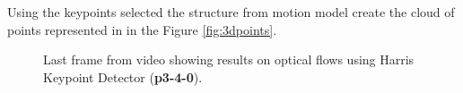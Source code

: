 \documentclass[12pt,a4paper]{article}
\begin{document}
Using the keypoints selected the structure from motion model create the cloud of points represented in in the Figure \ref{fig:3dpoints}.

\begin{figure}[!h]
	\centering
	\enskip
	\caption{Last frame from video showing results on optical flows using Harris Keypoint Detector (\textbf{p3-4-0}).}
	\label{fig:flowVideo}
\end{figure}
\end{document}
